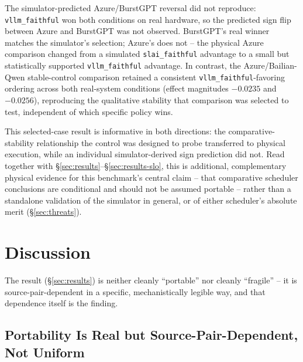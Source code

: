 \documentclass[sn-basic,Numbered,pdflatex]{sn-jnl}
\begin{document}
The simulator-predicted Azure/BurstGPT reversal did not reproduce: \texttt{vllm\_faithful} won both conditions on real hardware, so the predicted sign flip between Azure and BurstGPT was not observed. BurstGPT's real winner matches the simulator's selection; Azure's does not -- the physical Azure comparison changed from a simulated \texttt{slai\_faithful} advantage to a small but statistically supported \texttt{vllm\_faithful} advantage. In contrast, the Azure/Bailian-Qwen stable-control comparison retained a consistent \texttt{vllm\_faithful}-favoring ordering across both real-system conditions (effect magnitudes $-0.0235$ and $-0.0256$), reproducing the qualitative stability that comparison was selected to test, independent of which specific policy wins.

This selected-case result is informative in both directions: the comparative-stability relationship the control was designed to probe transferred to physical execution, while an individual simulator-derived sign prediction did not. Read together with \S\ref{sec:results}--\S\ref{sec:results-slo}, this is additional, complementary physical evidence for this benchmark's central claim -- that comparative scheduler conclusions are conditional and should not be assumed portable -- rather than a standalone validation of the simulator in general, or of either scheduler's absolute merit (\S\ref{sec:threats}).

\section{Discussion}
\label{sec:discussion}

The result (\S\ref{sec:results}) is neither cleanly ``portable'' nor
cleanly ``fragile'' -- it is source-pair-dependent in a specific,
mechanistically legible way, and that dependence itself is the finding.

\subsection{Portability Is Real but Source-Pair-Dependent, Not Uniform}
\end{document}
